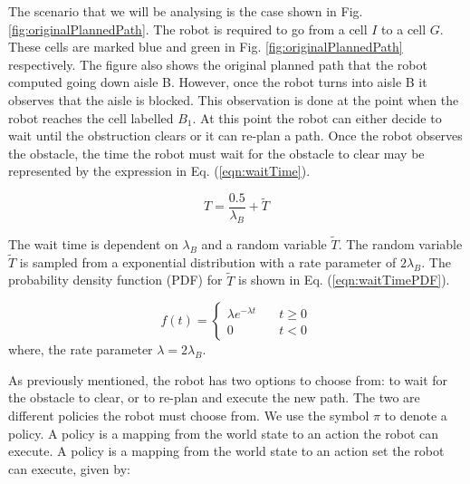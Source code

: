\documentclass[a4paper,12pt]{article}
\begin{document}
			The scenario that we will be analysing is the case shown in Fig. \ref{fig:originalPlannedPath}. The robot is required to go from a cell $I$ to a cell $G$. These cells are marked blue and green in Fig. \ref{fig:originalPlannedPath} respectively. The figure also shows the original planned path that the robot computed going down aisle B. However, once the robot turns into aisle B it observes that the aisle is blocked. This observation is done at the point when the robot reaches the cell labelled $B_{1}$. At this point the robot can either decide to wait until the obstruction clears or it can re-plan a path. Once the robot observes the obstacle, the time the robot must wait for the obstacle to clear may be represented by the expression in Eq. (\ref{eqn:waitTime}). 
			
			\begin{equation}
			T=\frac{0.5}{\lambda_{B}}+\widetilde{T}
			\label{eqn:waitTime}
			\end{equation}
			
			The wait time is dependent on $\lambda_{B}$ and a random variable $\widetilde{T}$. The random variable $\widetilde{T}$ is sampled from a exponential distribution with a rate parameter of $2\lambda_{B}$. The probability density function (PDF) for $\widetilde{T}$ is shown in Eq. (\ref{eqn:waitTimePDF}). 
			
			\begin{equation}
			f(t) = 
			\begin{cases}
			\lambda e^{-\lambda t} & \quad t \geq 0 \\
			0 & \quad t < 0
			\end{cases}
			\label{eqn:waitTimePDF}
			\end{equation}
			where, the rate parameter $\lambda = 2\lambda_{B}$. 
			
			As previously mentioned, the robot has two options to choose from: to wait for the obstacle to clear, or to re-plan and execute the new path. The two are different policies the robot must choose from. We use the symbol $\pi$ to denote a policy. A policy is a mapping from the world state to an action the robot can execute. A policy is a mapping from the world state to an action set the robot can execute, given by:
			
\end{document}
